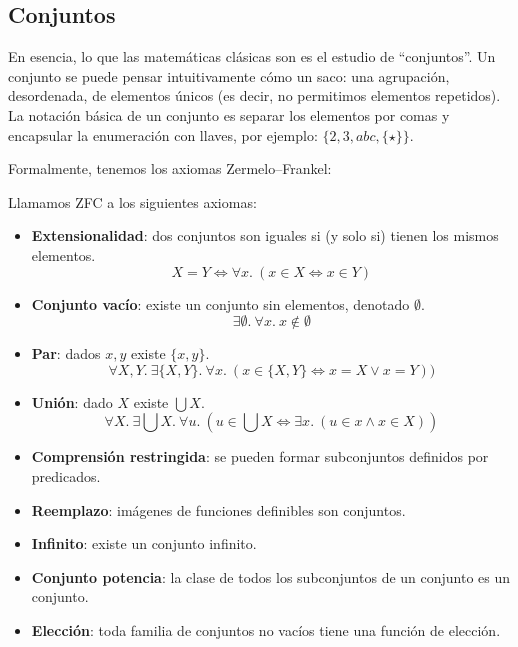 \documentclass[10pt]{article}
\begin{document}
\subsection{Conjuntos}

En esencia, lo que las matemáticas clásicas  son es el
estudio de ``conjuntos''. Un conjunto se puede pensar intuitivamente cómo un saco: una agrupación, desordenada, de elementos únicos (es decir, no permitimos elementos repetidos).
La notación básica de un conjunto es separar los elementos por comas y encapsular la enumeración con llaves, por ejemplo: $ \{2, 3, abc, \{\star\} \} $.

Formalmente, tenemos los axiomas Zermelo--Frankel:

\begin{definition}[ZFC]
  Llamamos ZFC a los siguientes axiomas:
  \begin{itemize}
    \item \textbf{Extensionalidad}: dos conjuntos son iguales si (y solo si) tienen los mismos elementos.
      \[ X = Y \iff \forall x.\ (x \in X \iff x \in Y) \]
    \item \textbf{Conjunto vacío}: existe un conjunto sin elementos, denotado $\emptyset$.
      \[ \exists \emptyset.\ \forall x.\ x \notin \emptyset \]
    \item \textbf{Par}: dados $x, y$ existe $\{x,y\}$.
      \[ \forall X, Y.\  \exists \{X, Y\}.\ \forall x.\ (x \in \{X, Y\} \iff x = X \vee x = Y)) \]
    \item \textbf{Unión}: dado $X$ existe $\bigcup X$.
      \[ \forall X.\ \exists \bigcup X.\ \forall u.\ (u \in \bigcup X \iff \exists x.\ (u \in x \wedge x \in X)) \]
    \item \textbf{Comprensión restringida}: se pueden formar subconjuntos definidos por predicados.
    \item \textbf{Reemplazo}: imágenes de funciones definibles son conjuntos.
    \item \textbf{Infinito}: existe un conjunto infinito.
    \item \textbf{Conjunto potencia}: la clase de todos los subconjuntos de un conjunto es un conjunto.
    \item \textbf{Elección}: toda familia de conjuntos no vacíos tiene una función de elección.
  \end{itemize}
\end{definition}
\end{document}
